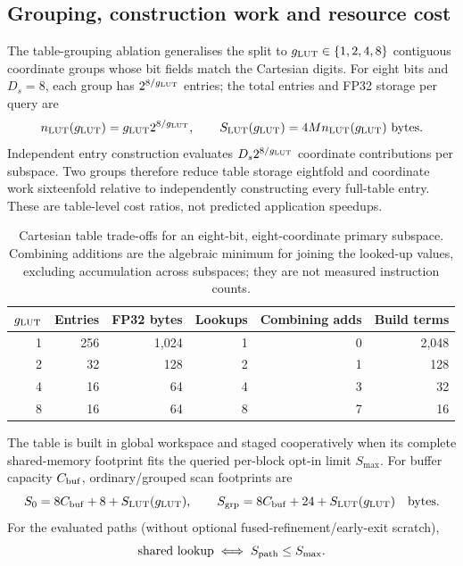 \subsection{Grouping, construction work and resource cost}

The table-grouping ablation generalises the split to $g_{\mathrm{LUT}}\in\{1,2,4,8\}$
contiguous coordinate groups whose bit fields match the Cartesian
digits. For eight bits and $D_s=8$, each group has $2^{8/g_{\mathrm{LUT}}}$ entries;
the total entries and FP32 storage per query are
\begin{equation}
 n_{\rm LUT}(g_{\mathrm{LUT}})=g_{\mathrm{LUT}} 2^{8/g_{\mathrm{LUT}}},\qquad S_{\rm LUT}(g_{\mathrm{LUT}})=4Mn_{\rm LUT}(g_{\mathrm{LUT}})\ \text{bytes}.
 \label{eq:5-lut-cost}
\end{equation}
Independent entry construction evaluates $D_s2^{8/g_{\mathrm{LUT}}}$ coordinate
contributions per subspace. Two groups therefore reduce table storage
eightfold and coordinate work sixteenfold relative to independently
constructing every full-table entry. These are table-level cost ratios,
not predicted application speedups.

\begin{table}[tbp]
\centering
\caption[Cartesian lookup-table trade-offs]{Cartesian table trade-offs for an eight-bit, eight-coordinate
primary subspace. Combining additions are the algebraic minimum for
joining the looked-up values, excluding accumulation across subspaces;
they are not measured instruction counts.}
\label{tab:5-lut-resources}
\small
\begin{tabular}{@{}rrrrrr@{}}
\toprule
$g_{\mathrm{LUT}}$ & Entries & FP32 bytes & Lookups & Combining adds & Build terms \\
\midrule
1 & 256 & 1,024 & 1 & 0 & 2,048 \\
2 & 32 & 128 & 2 & 1 & 128 \\
4 & 16 & 64 & 4 & 3 & 32 \\
8 & 16 & 64 & 8 & 7 & 16 \\
\bottomrule
\end{tabular}
\end{table}

The table is built in global workspace and staged cooperatively when
its complete shared-memory footprint fits the queried per-block opt-in
limit $S_{\max}$. For buffer capacity $C_{\rm buf}$, ordinary/grouped scan footprints are
\begin{equation}
 S_0=8C_{\rm buf}+8+S_{\rm LUT}(g_{\mathrm{LUT}}),\qquad
 S_{\rm grp}=8C_{\rm buf}+24+S_{\rm LUT}(g_{\mathrm{LUT}})
 \quad\text{bytes}.
 \label{eq:5-shared-footprint}
\end{equation}
For the evaluated paths (without optional fused-refinement/early-exit scratch),
\[
 \text{shared lookup}\iff S_{\rm path}\leq S_{\max}.
\]

